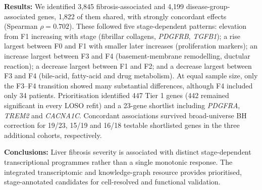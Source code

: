 \documentclass[11pt,a4paper]{article}
\begin{document}
\textbf{Results:} We identified 3,845 fibrosis-associated and 4,199 disease-group-associated genes, 1,822 of them shared, with strongly concordant effects (Spearman $\rho=0.702$). These followed five stage-dependent patterns: elevation from F1 increasing with stage (fibrillar collagens, \textit{PDGFRB}, \textit{TGFB1}); a rise largest between F0 and F1 with smaller later increases (proliferation markers); an increase largest between F3 and F4 (basement-membrane remodelling, ductular reaction); a decrease largest between F1 and F2; and a decrease largest between F3 and F4 (bile-acid, fatty-acid and drug metabolism). At equal sample size, only the F3--F4 transition showed many substantial differences, although F4 included only 34 patients. Prioritisation identified 447 Tier 1 genes (442 remained significant in every LOSO refit) and a 23-gene shortlist including \textit{PDGFRA}, \textit{TREM2} and \textit{CACNA1C}. Concordant associations survived broad-universe BH correction for 19/23, 15/19 and 16/18 testable shortlisted genes in the three additional cohorts, respectively.

\textbf{Conclusions:} Liver fibrosis severity is associated with distinct stage-dependent transcriptional programmes rather than a single monotonic response. The integrated transcriptomic and knowledge-graph resource provides prioritised, stage-annotated candidates for cell-resolved and functional validation.


\end{document}
